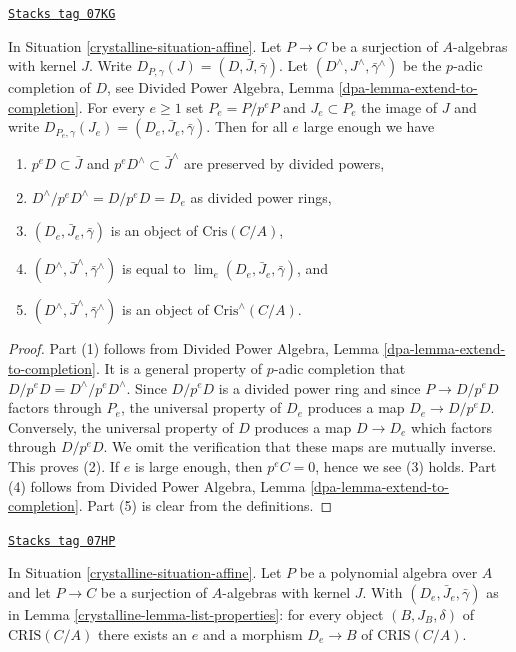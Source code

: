 \begin{lemma}
\label{crystalline-lemma-list-properties}
\href{https://stacks.math.columbia.edu/tag/07KG}{\texttt{Stacks tag 07KG}}

In Situation \ref{crystalline-situation-affine}.
Let $P \to C$ be a surjection of $A$-algebras with kernel $J$.
Write $D_{P, \gamma}(J) = (D, \bar J, \bar\gamma)$.
Let $(D^\wedge, J^\wedge, \bar\gamma^\wedge)$ be the
$p$-adic completion of $D$, see
Divided Power Algebra, Lemma \ref{dpa-lemma-extend-to-completion}.
For every $e \geq 1$ set $P_e = P/p^eP$ and $J_e \subset P_e$
the image of $J$ and write
$D_{P_e, \gamma}(J_e) = (D_e, \bar J_e, \bar\gamma)$.
Then for all $e$ large enough we have
\begin{enumerate}
\item $p^eD \subset \bar J$ and $p^eD^\wedge \subset \bar J^\wedge$
are preserved by divided powers,
\item $D^\wedge/p^eD^\wedge = D/p^eD = D_e$ as divided power rings,
\item $(D_e, \bar J_e, \bar\gamma)$ is an object of $\text{Cris}(C/A)$,
\item $(D^\wedge, \bar J^\wedge, \bar\gamma^\wedge)$ is equal to
$\lim_e (D_e, \bar J_e, \bar\gamma)$, and
\item $(D^\wedge, \bar J^\wedge, \bar\gamma^\wedge)$ is an object of
$\text{Cris}^\wedge(C/A)$.
\end{enumerate}
\end{lemma}

\begin{proof}
Part (1) follows from
Divided Power Algebra, Lemma \ref{dpa-lemma-extend-to-completion}.
It is a general property of $p$-adic completion that
$D/p^eD = D^\wedge/p^eD^\wedge$. Since $D/p^eD$ is a divided power ring
and since $P \to D/p^eD$ factors through $P_e$, the universal property of
$D_e$ produces a map $D_e \to D/p^eD$. Conversely, the universal property
of $D$ produces a map $D \to D_e$ which factors through $D/p^eD$. We omit
the verification that these maps are mutually inverse. This proves (2).
If $e$ is large enough, then $p^eC = 0$, hence we see (3) holds.
Part (4) follows from
Divided Power Algebra, Lemma \ref{dpa-lemma-extend-to-completion}.
Part (5) is clear from the definitions.
\end{proof}

\begin{lemma}
\label{crystalline-lemma-set-generators}
\href{https://stacks.math.columbia.edu/tag/07HP}{\texttt{Stacks tag 07HP}}

In Situation \ref{crystalline-situation-affine}.
Let $P$ be a polynomial algebra over $A$ and let
$P \to C$ be a surjection of $A$-algebras with kernel $J$.
With $(D_e, \bar J_e, \bar\gamma)$ as in Lemma \ref{crystalline-lemma-list-properties}:
for every object $(B, J_B, \delta)$ of $\text{CRIS}(C/A)$ there
exists an $e$ and a morphism $D_e \to B$ of $\text{CRIS}(C/A)$.
\end{lemma}

